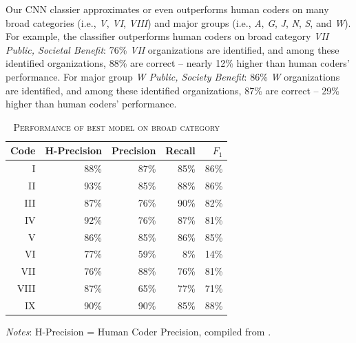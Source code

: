\documentclass[11pt]{article}
\begin{document}
Our CNN classier approximates or even outperforms human coders on many broad categories (i.e., \textit{V}, \textit{VI}, \textit{VIII}) and major groups (i.e., \textit{A}, \textit{G}, \textit{J}, \textit{N}, \textit{S}, and \textit{W}). For example, the classifier outperforms human coders on broad category \textit{VII Public, Societal Benefit}: 76\% \textit{VII} organizations are identified, and among these identified organizations, 88\% are correct -- nearly 12\% higher than human coders' performance. For major group \textit{W Public, Society Benefit}: 86\% \textit{W} organizations are identified, and among these identified organizations, 87\% are correct -- 29\% higher than human coders' performance.

\begin{table}
\centering
\begin{threeparttable}
    \caption{\textsc{Performance of best model on broad category}} \label{tab:perf_bc}
    \begin{tabular}{r|r|r|r|r}
		\hline
			Code & H-Precision & Precision & Recall & $F_1$ \\
		\hline
			I & 88\% & 87\% & 85\% & 86\% \\
			II & 93\% & 85\% & 88\% & 86\% \\
			III & 87\% & 76\% & 90\% & 82\% \\
			IV & 92\% & 76\% & 87\% & 81\% \\
			V & 86\% & 85\% & 86\% & 85\% \\
			VI & 77\% & 59\% & 8\% & 14\% \\
			VII & 76\% & 88\% & 76\% & 81\% \\
			VIII & 87\% & 65\% & 77\% & 71\% \\
			IX & 90\% & 90\% & 85\% & 88\% \\
    	 \hline
    \end{tabular}
\begin{tablenotes}
\footnotesize
\item \emph{Notes}: H-Precision = Human Coder Precision, compiled from \textcite[153]{StengelGettingItRight1998}.
\end{tablenotes}
\end{threeparttable}
\end{table}
\end{document}
